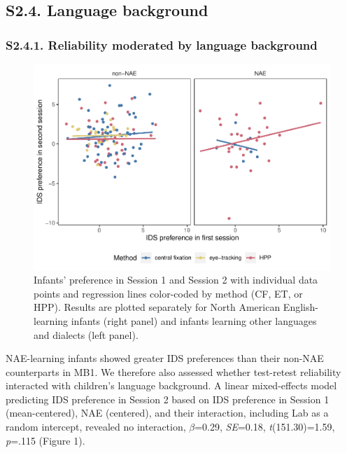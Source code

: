\documentclass[
  man, donotrepeattitle,floatsintext]{apa6}
\begin{document}
\hypertarget{s2.4.-language-background}{%
\subsection{S2.4. Language background}\label{s2.4.-language-background}}

\hypertarget{s2.4.1.-reliability-moderated-by-language-background}{%
\subsubsection{S2.4.1. Reliability moderated by language background}\label{s2.4.1.-reliability-moderated-by-language-background}}

\begin{figure}
\centering
\includegraphics{MB1T_supplement_files/figure-latex/unnamed-chunk-11-1.pdf}
\caption{\label{fig:unnamed-chunk-11}Infants' preference in Session 1 and Session 2 with individual data points and regression lines color-coded by method (CF, ET, or HPP). Results are plotted separately for North American English-learning infants (right panel) and infants learning other languages and dialects (left panel).}
\end{figure}

NAE-learning infants showed greater IDS preferences than their non-NAE counterparts in MB1.
We therefore also assessed whether test-retest reliability interacted with children's language background.
A linear mixed-effects model predicting IDS preference in Session 2 based on IDS preference in Session 1 (mean-centered), NAE (centered), and their interaction, including Lab as a random intercept, revealed no interaction, \(\beta\)=0.29, \emph{SE}=0.18, \emph{t}(151.30)=1.59, \emph{p}=.115 (Figure 1).
\end{document}
